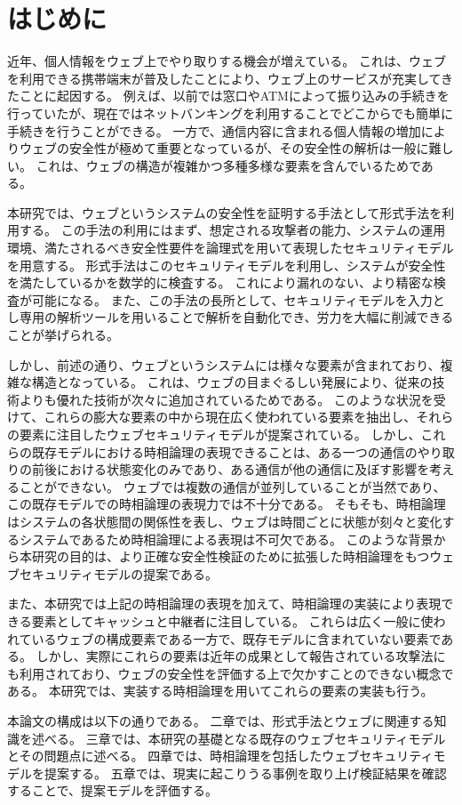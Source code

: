 \documentclass[12pt,a4paper]{jbook}
\begin{document}
\chapter{はじめに}
近年、個人情報をウェブ上でやり取りする機会が増えている。
これは、ウェブを利用できる携帯端末が普及したことにより、ウェブ上のサービスが充実してきたことに起因する。
例えば、以前では窓口やATMによって振り込みの手続きを行っていたが、現在ではネットバンキングを利用することでどこからでも簡単に手続きを行うことができる。
一方で、通信内容に含まれる個人情報の増加によりウェブの安全性が極めて重要となっているが、その安全性の解析は一般に難しい。
これは、ウェブの構造が複雑かつ多種多様な要素を含んでいるためである。
\color{red}

\color{black}

本研究では、ウェブというシステムの安全性を証明する手法として形式手法を利用する。
この手法の利用にはまず、想定される攻撃者の能力、システムの運用環境、満たされるべき安全性要件を論理式を用いて表現したセキュリティモデルを用意する。
形式手法はこのセキュリティモデルを利用し、システムが安全性を満たしているかを数学的に検査する。
これにより漏れのない、より精密な検査が可能になる。
また、この手法の長所として、セキュリティモデルを入力とし専用の解析ツールを用いることで解析を自動化でき、労力を大幅に削減できることが挙げられる。

しかし、前述の通り、ウェブというシステムには様々な要素が含まれており、複雑な構造となっている。
これは、ウェブの目まぐるしい発展により、従来の技術よりも優れた技術が次々に追加されているためである。
このような状況を受けて、これらの膨大な要素の中から現在広く使われている要素を抽出し、それらの要素に注目したウェブセキュリティモデルが提案されている\cite{webmodel,cookie-model}。
しかし、これらの既存モデルにおける時相論理の表現できることは、ある一つの通信のやり取りの前後における状態変化のみであり、ある通信が他の通信に及ぼす影響を考えることができない。
ウェブでは複数の通信が並列していることが当然であり、この既存モデルでの時相論理の表現力では不十分である。
そもそも、時相論理はシステムの各状態間の関係性を表し、ウェブは時間ごとに状態が刻々と変化するシステムであるため時相論理による表現は不可欠である。
このような背景から本研究の目的は、より正確な安全性検証のために拡張した時相論理をもつウェブセキュリティモデルの提案である。

また、本研究では上記の時相論理の表現を加えて、時相論理の実装により表現できる要素としてキャッシュと中継者に注目している。
これらは広く一般に使われているウェブの構成要素である一方で、既存モデルに含まれていない要素である。
しかし、実際にこれらの要素は近年の成果として報告されている攻撃法\cite{bcpattack}にも利用されており、ウェブの安全性を評価する上で欠かすことのできない概念である。
本研究では、実装する時相論理を用いてこれらの要素の実装も行う。

本論文の構成は以下の通りである。
二章では、形式手法とウェブに関連する知識を述べる。
三章では、本研究の基礎となる既存のウェブセキュリティモデルとその問題点に述べる。
四章では、時相論理を包括したウェブセキュリティモデルを提案する。
五章では、現実に起こりうる事例を取り上げ検証結果を確認することで、提案モデルを評価する。
\end{document}
